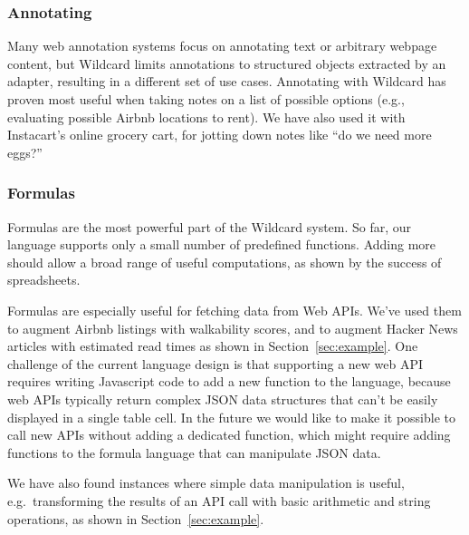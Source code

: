 \documentclass[sigplan,screen,10pt,anonymous,review]{acmart}
\begin{document}
\hypertarget{annotating}{%
\subsubsection{Annotating}\label{annotating}}

Many web annotation systems focus on annotating text or arbitrary
webpage content, but Wildcard limits annotations to structured objects
extracted by an adapter, resulting in a different set of use cases.
Annotating with Wildcard has proven most useful when taking notes on a
list of possible options (e.g., evaluating possible Airbnb locations to
rent). We have also used it with Instacart's online grocery cart, for
jotting down notes like ``do we need more eggs?''

\hypertarget{formulas}{%
\subsubsection{Formulas}\label{formulas}}

Formulas are the most powerful part of the Wildcard system. So far, our
language supports only a small number of predefined functions. Adding
more should allow a broad range of useful computations, as shown by the
success of spreadsheets.

Formulas are especially useful for fetching data from Web APIs. We've
used them to augment Airbnb listings with walkability scores, and to
augment Hacker News articles with estimated read times as shown in
Section~\ref{sec:example}. One challenge of the current language design
is that supporting a new web API requires writing Javascript code to add
a new function to the language, because web APIs typically return
complex JSON data structures that can't be easily displayed in a single
table cell. In the future we would like to make it possible to call new
APIs without adding a dedicated function, which might require adding
functions to the formula language that can manipulate JSON data.

We have also found instances where simple data manipulation is useful,
e.g.~transforming the results of an API call with basic arithmetic and
string operations, as shown in Section~\ref{sec:example}.
\end{document}
